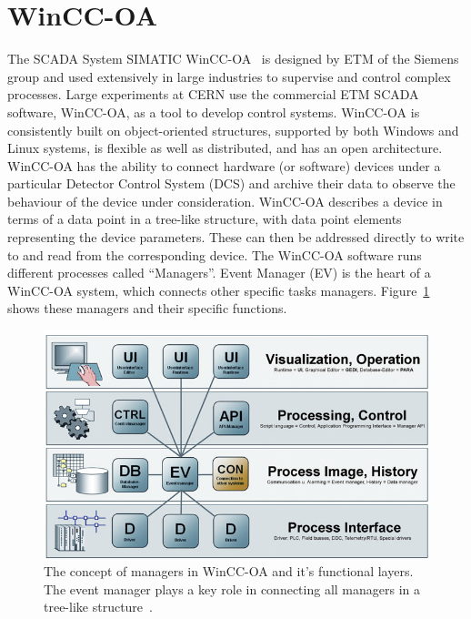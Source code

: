 \section{WinCC-OA}\label{sec:wincc}
The SCADA System SIMATIC WinCC-OA~\cite{wincc_oa} is designed by ETM of the Siemens group and used extensively in large industries to supervise and control complex processes. Large experiments at CERN use the commercial ETM SCADA software, WinCC-OA, as a tool to develop control systems. WinCC-OA is consistently built on object-oriented structures, supported by both Windows and Linux systems, is flexible as well as distributed, and has an open architecture. 
WinCC-OA has the ability to connect hardware (or software) devices under a particular Detector Control System (DCS) and archive their data to observe the behaviour of the device under consideration. WinCC-OA describes a device in terms of a data point in a tree-like structure, with data point elements representing the device parameters. These can then be addressed directly to write to and read from the corresponding device. 
The WinCC-OA software runs different processes called ``Managers''. Event Manager (EV) is the heart of a WinCC-OA system, which connects other specific tasks managers. Figure~\ref{fig:wincc_managers} shows these managers and their specific functions. 
\begin{figure}[h]
\centering
 \includegraphics[scale=0.4,trim=0 0 0 0,clip]{fig/wincc/winccOA_manager.jpg}
 \caption{The concept of managers in WinCC-OA and it's functional layers. The event manager plays a key role in connecting all managers in a tree-like structure~\cite{wincc_managers}.}
\label{fig:wincc_managers}
\end{figure}

